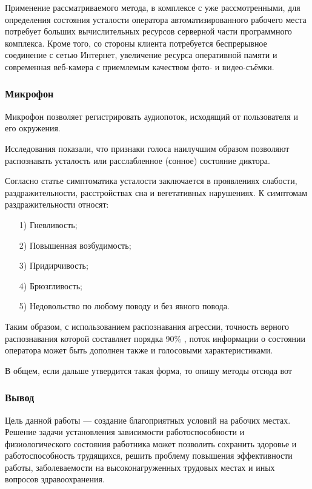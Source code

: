 Применение рассматриваемого метода, в комплексе с уже рассмотренными, для определения состояния усталости оператора автоматизированного рабочего места потребует больших вычислительных ресурсов серверной части программного комплекса. Кроме того, со стороны клиента потребуется беспрерывное соединение с сетью Интернет, увеличение ресурса оперативной памяти и современная веб-камера с приемлемым качеством фото- и видео-съёмки.

\subsubsection{Микрофон}
Микрофон позволяет регистрировать аудиопоток, исходящий от пользователя и его окружения.

Исследования \cite{recognitionOfPsycho} показали, что признаки голоса наилучшим образом позволяют распознавать усталость или расслабленное (сонное) состояние диктора. 

Согласно статье \cite{medObozr} симптоматика усталости заключается в проявлениях слабости, раздражительности, расстройствах сна и вегетативных нарушениях. К симптомам раздражительности относят:
\begin{itemize}[leftmargin=1.6\parindent]
\item[1)] Гневливость;
\item[2)] Повышенная возбудимость;
\item[3)] Придирчивость;
\item[4)] Брюзгливость;
\item[5)] Недовольство по любому поводу и без явного повода.
\end{itemize}

Таким образом, с использованием распознавания агрессии, точность верного распознавания которой составляет порядка 90\% \cite{recoginitionOfPsycho}, поток информации о состоянии оператора может быть дополнен также и голосовыми характеристиками.

В общем, если дальше утвердится такая форма, то опишу методы отсюда вот\cite{voiceMethod}

\subsubsection*{Вывод}
Цель данной работы --- создание благоприятных условий на рабочих местах. Решение задачи установления зависимости работоспособности и физиологического состояния работника может позволить сохранить здоровье и работоспособность трудящихся, решить проблему повышения эффективности работы, заболеваемости на высоконагруженных трудовых местах и иных вопросов здравоохранения.


\pagebreak
